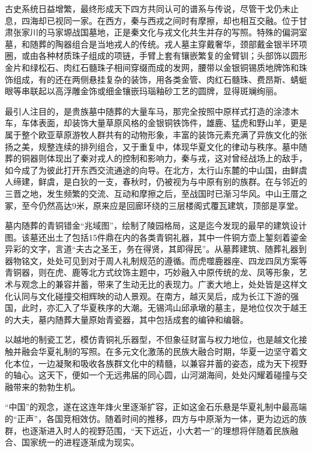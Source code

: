 古史系统日益增繁，最终形成天下四方共同认可的谱系与传说，尽管干戈仍未止息，四海却已视同一家。在西方，秦与西戎之间时有摩擦，却也相互交融。位于甘肃张家川的马家塬战国墓地，正是秦文化与戎文化共生并存的写照。特殊的偏洞室墓，和随葬的陶器组合是当地戎人的传统。戎人墓主穿戴奢华，颈部戴金银半环项圈，或由各种材质珠子组成的项链，手臂上套有镶嵌繁复的金臂钏；头部饰以圆形金片和绿松石、肉红石髓珠子相间穿缀而成的发网，腰带以金银铜锡质地牌饰和珠饰组成，有的还在两侧悬挂复杂的装饰，用各类金管、肉红石髓珠、费昂斯、蜻蜓眼等串联起以高浮雕金饰或细金镶嵌玛瑙釉砂工艺的圆牌，显得斑斓绚丽。

最引人注目的，是贵族墓中随葬的大量车马，那完全按照中原样式打造的涂漆木车，车体表面，却装饰大量草原风格的金银铜铁饰件，雄鹿、猛虎和野山羊，更是属于整个欧亚草原游牧人群共有的动物形象，丰富的装饰元素充满了异族文化的张扬之美，规整连续的排列组合，又于重复中，体现华夏文化的律动与秩序。墓中随葬的铜器则体现出了秦对戎人的控制和影响力，秦与戎，这对曾经战场上的敌手，如今成了为彼此打开东西交流通途的向导。在北方，太行山东麓的中山国，由鲜虞人缔建，鲜虞，是白狄的一支，春秋时，仍被视为与中原有别的族群。在与邻近的三晋之地，发生频繁的交流、互动和摩擦之后，至战国时已渐习华风。中山王厝之冢，至今仍然高达9米，原来应是回廊环绕的三层楼阁式覆瓦建筑，顶部是享堂。

墓内随葬的青铜错金“兆域图”，绘制了陵园格局，这是迄今发现的最早的建筑设计图。该墓还出土了包括15件鼎在内的各类青铜礼器，其中一件铜方壶上錾刻着鎏金异彩的文字，言道“夫古之圣王，务在得贤，其即得民”。从墓葬建筑、随葬礼器到器物铭文，处处可见到对于周人礼制规范的遵循。而虎噬鹿器座、四龙四凤方案等青铜器，则在虎、鹿等北方式纹饰主题中，巧妙融入中原传统的龙、凤等形象，艺术与观念上的兼容并蓄，带来了生动无比的表现力。广袤大地上，处处皆是这样文化认同与文化碰撞交相辉映的动人景观。在南方，越灭吴后，成为长江下游的强国，此时，亦汇入了华夏秩序的大潮。无锡鸿山邱承墩的墓主，是地位仅次于越王的大夫，墓内随葬大量原始青瓷器，其中包括成套的编钟和编磬。

以越地的制瓷工艺，模仿青铜礼乐器型，不但象征财富与权力地位，也是越文化接触并融会华夏礼制的写照。在多元文化激荡的民族大融合时期，华夏一边坚守着文化本位，一边凝聚和吸收各族群文化中的精髓，以兼容并蓄的姿态，成为天下视野的轴心。这天下，便如一个无远弗届的同心圆，山河湖海间，处处闪耀着碰撞与交融带来的勃勃生机。

“中国”的观念，遂在这连年烽火里逐渐扩容，正如这金石乐悬是华夏礼制中最高端的“正声”，各国竞相效仿。随着时间的推移，四方与中原渐为一体，更为边远的族群，也逐渐进入时人的视野范围，“天下远近，小大若一”的理想将伴随着民族融合、国家统一的进程逐渐成为现实。

